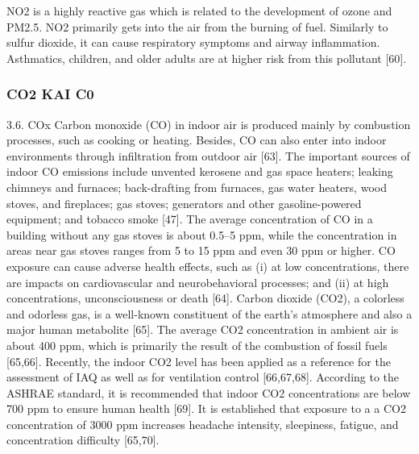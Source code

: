 \cite{ijerph17238972}

NO2 is a highly reactive gas which is related to the development of ozone and PM2.5. NO2 primarily gets into the air from the burning of fuel. Similarly to sulfur dioxide, it can cause respiratory symptoms and airway inflammation. Asthmatics, children, and older adults are at higher risk from this pollutant [60].

\cite{su12219045}

\subsubsection{CO2 KAI C0}

 3.6. COx
Carbon monoxide (CO) in indoor air is produced mainly by combustion processes, such as cooking or heating. Besides, CO can also enter into indoor environments through infiltration from outdoor air [63]. The important sources of indoor CO emissions include unvented kerosene and gas space heaters; leaking chimneys and furnaces; back-drafting from furnaces, gas water heaters, wood stoves, and fireplaces; gas stoves; generators and other gasoline-powered equipment; and tobacco smoke [47]. The average concentration of CO in a building without any gas stoves is about 0.5–5 ppm, while the concentration in areas near gas stoves ranges from 5 to 15 ppm and even 30 ppm or higher. CO exposure can cause adverse health effects, such as (i) at low concentrations, there are impacts on cardiovascular and neurobehavioral processes; and (ii) at high concentrations, unconsciousness or death [64].
Carbon dioxide (CO2), a colorless and odorless gas, is a well-known constituent of the earth’s atmosphere and also a major human metabolite [65]. The average CO2 concentration in ambient air is about 400 ppm, which is primarily the result of the combustion of fossil fuels [65,66]. Recently, the indoor CO2 level has been applied as a reference for the assessment of IAQ as well as for ventilation control [66,67,68]. According to the ASHRAE standard, it is recommended that indoor CO2 concentrations are below 700 ppm to ensure human health [69]. It is established that exposure to a a CO2 concentration of 3000 ppm increases headache intensity, sleepiness, fatigue, and concentration difficulty [65,70].

\cite{ijerph17238972}

